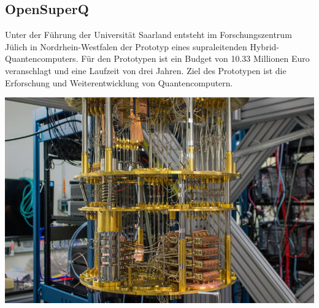 \documentclass[a0,portrait]{a0poster}
\begin{document}
\begin{multicols}{2}
\subsection*{OpenSuperQ}
Unter der Führung der Universität Saarland entsteht im Forschungszentrum Jülich in Nordrhein-Westfalen der Prototyp eines supraleitenden Hybrid-Quantencomputers. Für den Prototypen ist ein Budget von 10.33 Millionen Euro veranschlagt und eine Laufzeit von drei Jahren\cite{QUANTUM}. Ziel des Prototypen ist die Erforschung und Weiterentwicklung von Quantencomputern.
\begin{center}\vspace{1cm}
\includegraphics[width=0.8\linewidth]{ibm.jpg}
\end{center}\vspace{1cm}


\end{multicols}
\end{document}
